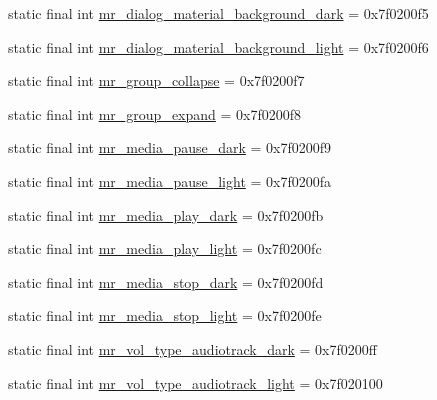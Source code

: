 \begin{CompactItemize}
\item 
static final int \hyperlink{classandroid_1_1support_1_1graphics_1_1drawable_1_1_r_1_1drawable_b75e5b758450481ad1f1e3ad0a5b3e7e}{mr\_\-dialog\_\-material\_\-background\_\-dark} = 0x7f0200f5
\item 
static final int \hyperlink{classandroid_1_1support_1_1graphics_1_1drawable_1_1_r_1_1drawable_8671d76ade71d0e866d4a48f066d8786}{mr\_\-dialog\_\-material\_\-background\_\-light} = 0x7f0200f6
\item 
static final int \hyperlink{classandroid_1_1support_1_1graphics_1_1drawable_1_1_r_1_1drawable_27bcbeab5826e9716f5ed6eb43a9445e}{mr\_\-group\_\-collapse} = 0x7f0200f7
\item 
static final int \hyperlink{classandroid_1_1support_1_1graphics_1_1drawable_1_1_r_1_1drawable_7a931c96ed386c28538135ab5c5324d2}{mr\_\-group\_\-expand} = 0x7f0200f8
\item 
static final int \hyperlink{classandroid_1_1support_1_1graphics_1_1drawable_1_1_r_1_1drawable_81270ea91a87720eb4040b9c9cf2f05e}{mr\_\-media\_\-pause\_\-dark} = 0x7f0200f9
\item 
static final int \hyperlink{classandroid_1_1support_1_1graphics_1_1drawable_1_1_r_1_1drawable_1ad386bb2af6526138e96b70a8fe7f2c}{mr\_\-media\_\-pause\_\-light} = 0x7f0200fa
\item 
static final int \hyperlink{classandroid_1_1support_1_1graphics_1_1drawable_1_1_r_1_1drawable_20d2868922f3702341750427c903f765}{mr\_\-media\_\-play\_\-dark} = 0x7f0200fb
\item 
static final int \hyperlink{classandroid_1_1support_1_1graphics_1_1drawable_1_1_r_1_1drawable_1aa57bf947f1aa926bd447577163c237}{mr\_\-media\_\-play\_\-light} = 0x7f0200fc
\item 
static final int \hyperlink{classandroid_1_1support_1_1graphics_1_1drawable_1_1_r_1_1drawable_4f03d434505e0ba4a184030b13f1093a}{mr\_\-media\_\-stop\_\-dark} = 0x7f0200fd
\item 
static final int \hyperlink{classandroid_1_1support_1_1graphics_1_1drawable_1_1_r_1_1drawable_ed47851aa46a57f29a85df8e6ccf85e6}{mr\_\-media\_\-stop\_\-light} = 0x7f0200fe
\item 
static final int \hyperlink{classandroid_1_1support_1_1graphics_1_1drawable_1_1_r_1_1drawable_a40cd5743a236b38f637aaae0a1604f5}{mr\_\-vol\_\-type\_\-audiotrack\_\-dark} = 0x7f0200ff
\item 
static final int \hyperlink{classandroid_1_1support_1_1graphics_1_1drawable_1_1_r_1_1drawable_b2d8ca256b505c2751b07d469dd7c7be}{mr\_\-vol\_\-type\_\-audiotrack\_\-light} = 0x7f020100

\end{CompactItemize}
